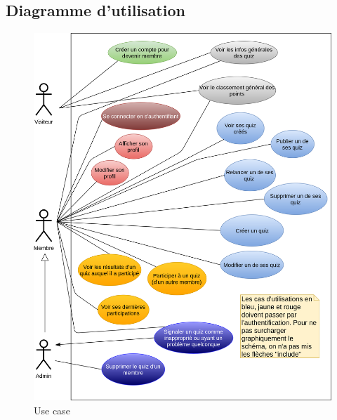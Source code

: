 \documentclass[a4paper, 12pt]{article}
\begin{document}
\subsection{Diagramme d'utilisation}
\begin{figure}
	\begin{center}
		\includegraphics[width=1.0\textwidth]{../diagrams/UseCaseQuiz.png}
	\end{center}
    \caption{Use case}
\end{figure}
\end{document}
